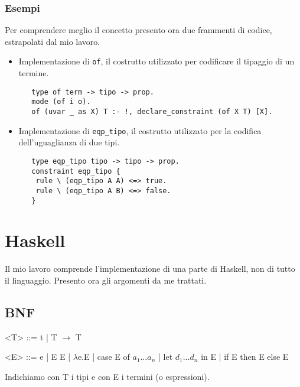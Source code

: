 \documentclass[12pt,a4paper,openright,twoside]{report}
\begin{document}
\subsubsection{Esempi}
Per comprendere meglio il concetto presento ora due frammenti di codice, estrapolati dal mio lavoro.\\
\begin{itemize}
 \item Implementazione di \verb"of", il costrutto utilizzato per codificare il tipaggio di un termine.
  \begin{verbatim}
   type of term -> tipo -> prop.
   mode (of i o).
   of (uvar _ as X) T :- !, declare_constraint (of X T) [X].
  \end{verbatim}
 \item Implementazione di \verb"eqp_tipo", il costrutto utilizzato per la codifica dell'uguaglianza di due tipi.
  \begin{verbatim}
   type eqp_tipo tipo -> tipo -> prop.
   constraint eqp_tipo {
    rule \ (eqp_tipo A A) <=> true.
    rule \ (eqp_tipo A B) <=> false.
   }
  \end{verbatim}
\end{itemize}

\section{Haskell}

Il mio lavoro comprende l'implementazione di una parte di Haskell, non di tutto il linguaggio. Presento ora gli argomenti da me trattati.

\subsection{BNF}
\begin{grammar}
 \let\syntleft\relax    %
 \let\syntright\relax   %
 <T> ::= t | T $\rightarrow$ T
 
 <E> ::= e | E E | $\lambda$e.E | case E of $a_1 \ldots a_n$ | let $d_1 \ldots d_n$ in E | if E then E else E
\end{grammar}
Indichiamo con T i tipi e con E i termini (o espressioni).

\end{document}
